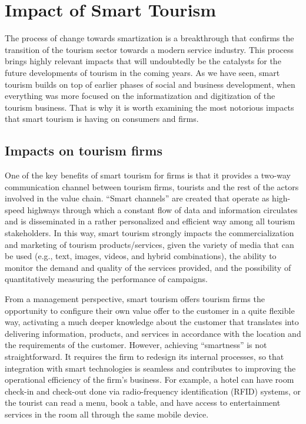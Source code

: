 \documentclass[
  letterpaper,
  DIV=11,
  numbers=noendperiod]{scrreprt}
\begin{document}
\hypertarget{impact-of-smart-tourism}{%
\section{Impact of Smart Tourism}\label{impact-of-smart-tourism}}

The process of change towards smartization is a breakthrough that
confirms the transition of the tourism sector towards a modern service
industry. This process brings highly relevant impacts that will
undoubtedly be the catalysts for the future developments of tourism in
the coming years. As we have seen, smart tourism builds on top of
earlier phases of social and business development, when everything was
more focused on the informatization and digitization of the tourism
business. That is why it is worth examining the most notorious impacts
that smart tourism is having on consumers and firms.

\hypertarget{impacts-on-tourism-firms}{%
\subsection{Impacts on tourism firms}\label{impacts-on-tourism-firms}}

One of the key benefits of smart tourism for firms is that it provides a
two-way communication channel between tourism firms, tourists and the
rest of the actors involved in the value chain. ``Smart channels'' are
created that operate as high-speed highways through which a constant
flow of data and information circulates and is disseminated in a rather
personalized and efficient way among all tourism stakeholders. In this
way, smart tourism strongly impacts the commercialization and marketing
of tourism products/services, given the variety of media that can be
used (e.g., text, images, videos, and hybrid combinations), the ability
to monitor the demand and quality of the services provided, and the
possibility of quantitatively measuring the performance of campaigns.

From a management perspective, smart tourism offers tourism firms the
opportunity to configure their own value offer to the customer in a
quite flexible way, activating a much deeper knowledge about the
customer that translates into delivering information, products, and
services in accordance with the location and the requirements of the
customer. However, achieving ``smartness'' is not straightforward. It
requires the firm to redesign its internal processes, so that
integration with smart technologies is seamless and contributes to
improving the operational efficiency of the firm's business. For
example, a hotel can have room check-in and check-out done via
radio-frequency identification (RFID) systems, or the tourist can read a
menu, book a table, and have access to entertainment services in the
room all through the same mobile device.
\end{document}
